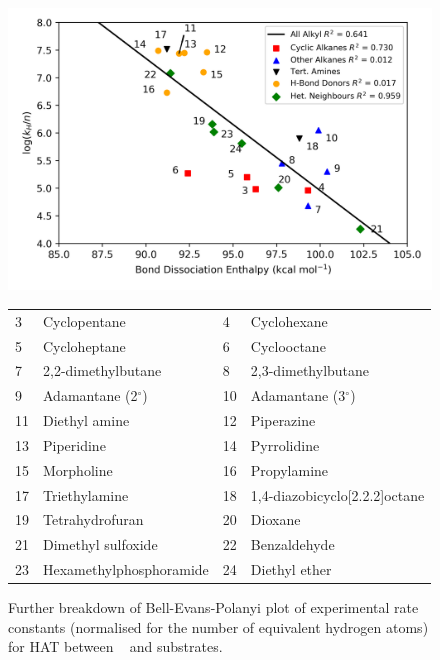 \begin{figure}[!htbp]
  \centering
  \includegraphics[width=\textwidth]{figures/bep-breakdown}
  \begin{tabularx}{\textwidth}{| l X l X |}
    \hline
    3 & Cyclopentane & 4 & Cyclohexane \\
    5 & Cycloheptane & 6 & Cyclooctane \\
    7 & 2,2-dimethylbutane & 8 & 2,3-dimethylbutane \\
    9 & Adamantane (2$^\circ$) & 10 & Adamantane (3$^\circ$) \\
    11 & Diethyl amine & 12 & Piperazine \\
    13 & Piperidine & 14 & Pyrrolidine \\
    15 & Morpholine & 16 & Propylamine \\
    17 & Triethylamine & 18 & 1,4-diazobicyclo[2.2.2]octane \\
    19 & Tetrahydrofuran & 20 & Dioxane \\
    21 & Dimethyl sulfoxide & 22 & Benzaldehyde \\
    23 & Hexamethylphosphoramide & 24 & Diethyl ether \\
    \hline
  \end{tabularx}
  \caption[Further breakdown of Bell-Evans-Polanyi plot of experimental rate constants (normalised for the number of equivalent hydrogen atoms) for HAT between \cumo~ and alkyl substrates against BDEs calculated using the ROCBS-QB3 method.]{Further breakdown of Bell-Evans-Polanyi plot of experimental rate constants (normalised for the number of equivalent hydrogen atoms) for HAT between \cumo~ and  substrates.}
\label{fig:bep-breakdown}
\end{figure}

